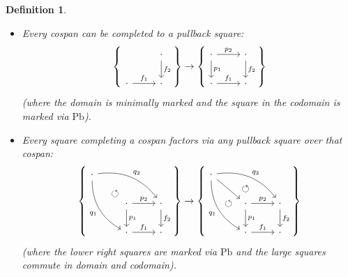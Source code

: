 \documentclass{article}
\newtheorem{definition}{Definition}
\begin{document}
\begin{definition}
\begin{itemize}
\begin{equation}
\begin{tikzcd}
            \cdot \arrow[r, "f_1"] & \cdot
          \end{tikzcd}
        \right\}
      \end{equation}
      (where the squares in domain and codomain are marked via $\mathrm{Pb}$ but only the latter commutes).
    \item
      Every cospan can be completed to a pullback square:
      \begin{equation}
        \left\{
          \begin{tikzcd}
            & \cdot \arrow[d, "f_2"] \\
            \cdot \arrow[r, "f_1"] & \cdot 
          \end{tikzcd}
        \right\}
        \rightarrow
        \left\{
          \begin{tikzcd}
            \cdot \arrow[r, "p_2"] \arrow[d, "p_1"] & \cdot \arrow[d, "f_2"] \\
            \cdot \arrow[r, "f_1"] & \cdot
          \end{tikzcd}
        \right\}
      \end{equation}
      (where the domain is minimally marked and the square in the codomain is marked via $\mathrm{Pb}$).
    \item
      Every square completing a cospan factors via any pullback square over that cospan:
      \begin{equation}
        \left\{
          \begin{tikzcd}
            \cdot \arrow[ddr, bend right, "q_1"'] \arrow[drr, bend left, "q_2"] \arrow[dr, phantom, "\circlearrowleft", near end] \\
            & \cdot \arrow[d, "p_1"] \arrow[r, "p_2"] & \cdot \arrow[d, "f_2"] \\
            & \cdot \arrow[r, "f_1"] & \cdot
          \end{tikzcd}
        \right\}
        \rightarrow
        \left\{
          \begin{tikzcd}
            \cdot \arrow[ddr, bend right, "q_1"'] \arrow[ddr, phantom, "\circlearrowleft"] \arrow[drr, bend left, "q_2"] \arrow[drr, phantom, "\circlearrowleft"] \arrow[dr] \\
            & \cdot \arrow[d, "p_1"] \arrow[r, "p_2"] & \cdot \arrow[d, "f_2"] \\
            & \cdot \arrow[r, "f_1"] & \cdot
          \end{tikzcd}
        \right\}
      \end{equation}
      (where the lower right squares are marked via $\mathrm{Pb}$ and the large squares commute in domain and codomain).

\end{itemize}
\end{definition}
\end{document}
